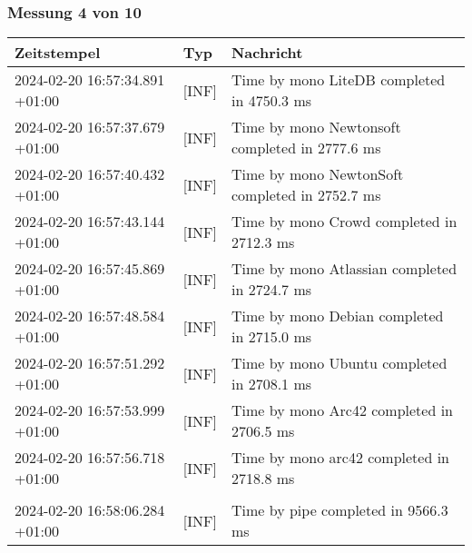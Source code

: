     \subsubsection*{Messung 4 von 10} \label{subsubsec:LiteDbWenigerPaketeAlsDb4von10}
        {
            {\small
                \begin{tabularx}{\textwidth}{|l|l|X|}
                    \hline
                    \textbf{Zeitstempel} & \textbf{Typ} & \textbf{Nachricht} \\
                    \hline
                    \endhead
                    2024-02-20 16:57:34.891 +01:00 & [INF] & Time by mono LiteDB completed in 4750.3 ms \\
                    2024-02-20 16:57:37.679 +01:00 & [INF] & Time by mono Newtonsoft completed in 2777.6 ms \\
                    2024-02-20 16:57:40.432 +01:00 & [INF] & Time by mono NewtonSoft completed in 2752.7 ms \\
                    2024-02-20 16:57:43.144 +01:00 & [INF] & Time by mono Crowd completed in 2712.3 ms \\
                    2024-02-20 16:57:45.869 +01:00 & [INF] & Time by mono Atlassian completed in 2724.7 ms \\
                    2024-02-20 16:57:48.584 +01:00 & [INF] & Time by mono Debian completed in 2715.0 ms \\
                    2024-02-20 16:57:51.292 +01:00 & [INF] & Time by mono Ubuntu completed in 2708.1 ms \\
                    2024-02-20 16:57:53.999 +01:00 & [INF] & Time by mono Arc42 completed in 2706.5 ms \\
                    2024-02-20 16:57:56.718 +01:00 & [INF] & Time by mono arc42 completed in 2718.8 ms \\
                    & & \\
                    2024-02-20 16:58:06.284 +01:00 & [INF] & Time by pipe completed in 9566.3 ms \\
                    \hline
                \end{tabularx}
            }
        }

